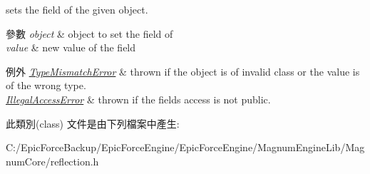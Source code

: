 sets the field of the given object. 


\begin{DoxyParams}{參數}
{\em object} & object to set the field of \\
\hline
{\em value} & new value of the field \\
\hline
\end{DoxyParams}

\begin{DoxyExceptions}{例外}
{\em \hyperlink{classagm_1_1reflection_1_1_type_mismatch_error}{Type\+Mismatch\+Error}} & thrown if the object is of invalid class or the value is of the wrong type. \\
\hline
{\em \hyperlink{classagm_1_1reflection_1_1_illegal_access_error}{Illegal\+Access\+Error}} & thrown if the field\textquotesingle{}s access is not public. \\
\hline
\end{DoxyExceptions}


此類別(class) 文件是由下列檔案中產生\+:\begin{DoxyCompactItemize}
\item 
C\+:/\+Epic\+Force\+Backup/\+Epic\+Force\+Engine/\+Epic\+Force\+Engine/\+Magnum\+Engine\+Lib/\+Magnum\+Core/reflection.\+h\end{DoxyCompactItemize}

